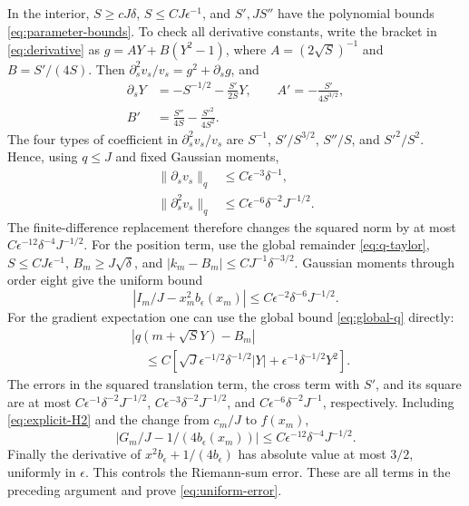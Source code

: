 \documentclass[aps,pra,reprint,superscriptaddress]{revtex4-2}
\theoremstyle{remark}
\newcommand{\norm}[1]{\lVert#1\rVert}
\begin{document}
In the interior, $S\geq cJ\delta$, $S\leq CJ\epsilon^{-1}$,
and $S',JS''$ have the polynomial bounds \eqref{eq:parameter-bounds}.
To check all derivative constants, write the bracket in
\eqref{eq:derivative} as
$g=A Y+B(Y^2-1)$, where $A=(2\sqrt S)^{-1}$ and $B=S'/(4S)$.
Then $\partial_s^2v_s/v_s=g^2+\partial_sg$, and
\begin{align*}
 \partial_sY&=-S^{-1/2}-\frac{S'}{2S}Y,\qquad
 A'=-\frac{S'}{4S^{3/2}},\\
 B'&=\frac{S''}{4S}-\frac{S'^2}{4S^2}.
\end{align*}
The four types of coefficient in $\partial_s^2v_s/v_s$ are
$S^{-1}$, $S'/S^{3/2}$, $S''/S$, and $S'^2/S^2$. Hence, using
$q\leq J$ and fixed Gaussian moments,
\begin{equation}
\begin{aligned}
\norm{\partial_sv_s}_q&\leq C\epsilon^{-3}\delta^{-1},\\
\norm{\partial_s^2v_s}_q&\leq C\epsilon^{-6}\delta^{-2}J^{-1/2}.
\end{aligned}
\label{eq:explicit-H2}
\end{equation}
The finite-difference replacement therefore changes the squared
norm by at most $C\epsilon^{-12}\delta^{-4}J^{-1/2}$.
For the position term, use the global remainder
\eqref{eq:q-taylor}, $S\leq CJ\epsilon^{-1}$,
$B_m\geq J\sqrt\delta$, and
$|k_m-B_m|\leq CJ^{-1}\delta^{-3/2}$.
Gaussian moments through order eight give the uniform bound
\begin{equation}
 \left|I_m/J-x_m^2b_\epsilon(x_m)\right|
 \leq C\epsilon^{-2}\delta^{-6}J^{-1/2}.
 \label{eq:explicit-I}
\end{equation}
For the gradient expectation one can use the global bound
\eqref{eq:global-q} directly:
\begin{align*}
 &|q(m+\sqrt S Y)-B_m|\\
 &\quad\leq C\left[\sqrt J\epsilon^{-1/2}\delta^{-1/2}|Y|
             +\epsilon^{-1}\delta^{-1/2}Y^2\right].
\end{align*}
The errors in the squared translation term, the cross term with
$S'$, and its square are at most
$C\epsilon^{-1}\delta^{-2}J^{-1/2}$,
$C\epsilon^{-3}\delta^{-2}J^{-1/2}$, and
$C\epsilon^{-6}\delta^{-2}J^{-1}$, respectively. Including
\eqref{eq:explicit-H2} and the change from $c_m/J$ to $f(x_m)$,
\begin{equation}
 \left|G_m/J-1/(4b_\epsilon(x_m))\right|
 \leq C\epsilon^{-12}\delta^{-4}J^{-1/2}.
 \label{eq:explicit-G}
\end{equation}
Finally the derivative of $x^2b_\epsilon+1/(4b_\epsilon)$ has
absolute value at most $3/2$, uniformly in $\epsilon$.
This controls the Riemann-sum error. These
are all terms in the preceding argument and prove
\eqref{eq:uniform-error}.
\end{document}
